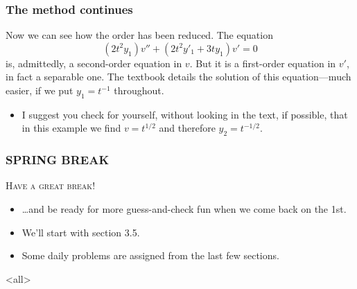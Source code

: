 \begin{frame}

\frametitle{The method continues}
\label{themethodcontinues}

Now we can see how the order has been reduced. The equation
\[ (2t^2 y_1) v'' + (2t^2 y'_1 + 3t y_1) v' = 0 \]
is, admittedly, a second-order equation in $ v $. But it is a first-order equation in $ v' $, in fact a separable one. The textbook details the solution of this equation---much easier, if we put $ y_1 = t^{-1} $ throughout.

\begin{itemize}
\item I suggest you check for yourself, without looking in the text, if possible, that in this example we find $ v = t^{1/2} $ and therefore $ y_2 = t^{-1/2} $.

\end{itemize}

\end{frame}

\begin{frame}

\frametitle{SPRING BREAK}
\label{springbreak}

{\Huge \textsc{Have a great break!}}

\begin{itemize}
\item {\ldots}and be ready for more guess-and-check fun when we come back on the 1st.

\item We'll start with section 3.5.

\item Some daily problems are assigned from the last few sections.

\end{itemize}

\end{frame}

\mode<all>


\mode*

